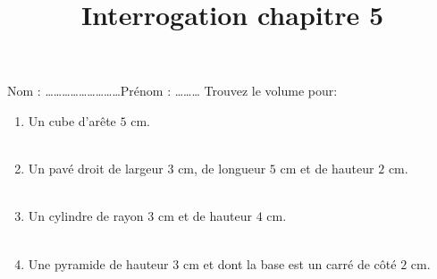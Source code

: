 \documentclass[14 pt]{extarticle}
\title{Interrogation chapitre 5}
\date{}
\theoremstyle{plain}
\begin{document}
 Nom : \ldots\ldots\ldots\ldots\ldots\ldots\ldots\ldots\ldots Prénom : \ldots\ldots\ldots  
Trouvez le volume pour: \begin{enumerate}
\item Un cube d'arête $5$ cm. 
\\ \ 
\item Un pavé droit de largeur $3$ cm, de longueur $5$ cm et de hauteur $2$ cm. 
\\ \ 
\item Un cylindre de rayon $3$ cm et de hauteur $4$ cm. 
\\ \ 
\item Une pyramide de hauteur $3$ cm et dont la base est un carré de côté $2$ cm. 
\\ \ 

\end{enumerate}
 
\end{document}
